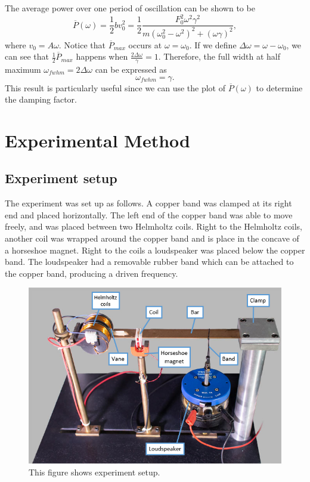 \documentclass[a4paper,12pt]{article}
\begin{document}
The average power over one period of oscillation can be shown to be
\begin{equation}
	\label{eqn: avg p}
	\overline{P}(\omega) = \frac{1}{2}bv_0^2 = \frac{1}{2}\frac{F_0^2\omega^2 \gamma^2}{m(\omega_0^2 - \omega^2)^2 + (\omega\gamma)^2},
\end{equation}
where \( v_0 = A\omega \). Notice that \( \overline{P}_{max} \) occurs at \( \omega = \omega_0 \).
If we define \( \Delta \omega = \omega - \omega_0 \),  we can see that \( \frac{1}{2} \overline{P}_{max} \) happens when \( \frac{2\Delta \omega}{\gamma} = 1\). Therefore, the full width at half maximum \( \omega_{fwhm} = 2\Delta \omega\) can be expressed as
\begin{equation}
	\omega_{fwhm} = \gamma.
\end{equation}
This result is particularly useful since we can use the plot of \( \overline{P}(\omega) \) to determine the damping factor.
\section{Experimental Method}
\subsection{Experiment setup}
The experiment was set up  as follows. A copper band was clamped at its right end and placed horizontally. The left end of the copper band was able to move freely, and was placed between two Helmholtz coils. Right to the Helmholtz coils, another coil was wrapped around the copper band and is place in the concave of a horseshoe magnet. Right to the coils a loudspeaker was placed below the copper band. The loudspeaker had a removable rubber band which can be attached to the copper band, producing a driven frequency.
\begin{figure}[h]
	\centering
	\includegraphics[scale=0.4]{Images/IMG_1805_equipment-labelled.jpg}
	\caption{This figure \cite{Prelab} shows experiment setup.}
\end{figure}
\end{document}
